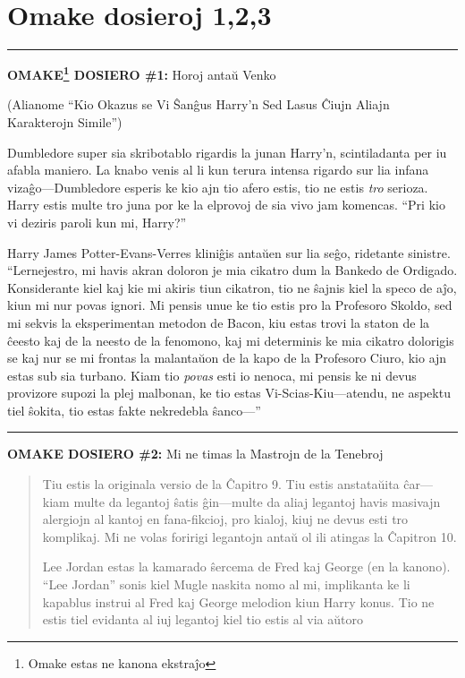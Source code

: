 \chapter{Omake dosieroj 1,2,3}

\begin{center}\rule{3in}{0.4pt}\end{center}

\textbf{OMAKE\footnote{Omake estas ne kanona ekstraĵo} DOSIERO \#1:} {
    Horoj antaŭ Venko}

(Alianome ``Kio Okazus se Vi Ŝanĝus Harry'n Sed Lasus Ĉiujn Aliajn Karakterojn Simile'')

Dumbledore super sia skribotablo rigardis la junan Harry'n,
scintiladanta per iu afabla maniero. La knabo venis al li kun terura
intensa rigardo sur lia infana vizaĝo—Dumbledore esperis ke kio ajn
tio afero estis, tio ne estis \emph{tro} serioza. Harry estis multe
tro juna por ke la elprovoj de sia vivo jam komencas. ``Pri kio vi
deziris paroli kun mi, Harry?''

Harry James Potter-Evans-Verres kliniĝis antaŭen sur lia seĝo, ridetante
sinistre. ``Lernejestro, mi havis akran doloron je mia cikatro dum la
Bankedo de Ordigado. Konsiderante kiel kaj kie mi akiris tiun
cikatron, tio ne ŝajnis kiel la speco de aĵo, kiun mi nur povas
ignori. Mi pensis unue ke tio estis pro la Profesoro Skoldo, sed mi
sekvis la eksperimentan metodon de Bacon, kiu estas trovi la staton de
la ĉeesto kaj de la neesto de la fenomono, kaj mi determinis ke mia
cikatro dolorigis se kaj nur se mi frontas la malantaŭon de la kapo de
la Profesoro Ciuro, kio ajn estas sub sia turbano. Kiam tio
\emph{povas} esti io nenoca, mi pensis ke ni devus provizore supozi la
plej malbonan, ke tio estas Vi-Scias-Kiu—atendu, ne aspektu tiel
ŝokita, tio estas fakte nekredebla ŝanco—''

\begin{center}\rule{3in}{0.4pt}\end{center}

\textbf{OMAKE DOSIERO \#2:} {\hpfont Mi ne timas la Mastrojn de la Tenebroj}

\begin{quote}
  Tiu estis la originala versio de la Ĉapitro 9. Tiu estis anstataŭita
  ĉar—kiam multe da legantoj ŝatis ĝin—multe da aliaj legantoj havis
  masivajn alergiojn al kantoj en fana-fikcioj, pro kialoj, kiuj ne
  devus esti tro komplikaj. Mi ne volas foririgi legantojn antaŭ ol
  ili atingas la Ĉapitron 10.

  Lee Jordan estas la kamarado ŝercema de Fred kaj George (en la
  kanono). ``Lee Jordan'' sonis kiel Mugle naskita nomo al mi,
  implikanta ke li kapablus instrui al Fred kaj George melodion kiun
  Harry konus. Tio ne estis tiel evidanta al iuj legantoj kiel tio
  estis al via aŭtoro
\end{quote}

